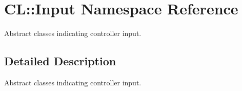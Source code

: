 \hypertarget{namespaceCL_1_1Input}{
\section{CL::Input Namespace Reference}
\label{namespaceCL_1_1Input}
}


Abstract classes indicating controller input.  


\subsection{Detailed Description}
Abstract classes indicating controller input. 